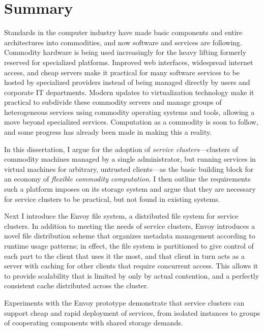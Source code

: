 \chapter*{Summary}

Standards in the computer industry have made basic components and entire architectures into commodities, and now software and services are following. Commodity hardware is being used increasingly for the heavy lifting formerly reserved for specialized platforms. Improved web interfaces, widespread internet access, and cheap servers make it practical for many software services to be hosted by specialized providers instead of being managed directly by users and corporate IT departments. Modern updates to virtualization technology make it practical to subdivide these commodity servers and manage groups of heterogeneous services using commodity operating systems and tools, allowing a move beyond specialized services. Computation as a commodity is soon to follow, and some progress has already been made in making this a reality.

In this dissertation, I argue for the adoption of \emph{service clusters}---clusters of commodity machines managed by a single administrator, but running services in virtual machines for arbitrary, untrusted clients---as the basic building block for an economy of \emph{flexible commodity computation}. I then outline the requirements such a platform imposes on its storage system and argue that they are necessary for service clusters to be practical, but not found in existing systems.

Next I introduce the Envoy file system, a distributed file system for service clusters. In addition to meeting the needs of service clusters, Envoy introduces a novel file distribution scheme that organizes metadata management according to runtime usage patterns; in effect, the file system is partitioned to give control of each part to the client that uses it the most, and that client in turn acts as a server with caching for other clients that require concurrent access. This allows it to provide scalability that is limited by only by actual contention, and a perfectly consistent cache distributed across the cluster.

Experiments with the Envoy prototype demonstrate that service clusters can support cheap and rapid deployment of services, from isolated instances to groups of cooperating components with shared storage demands.